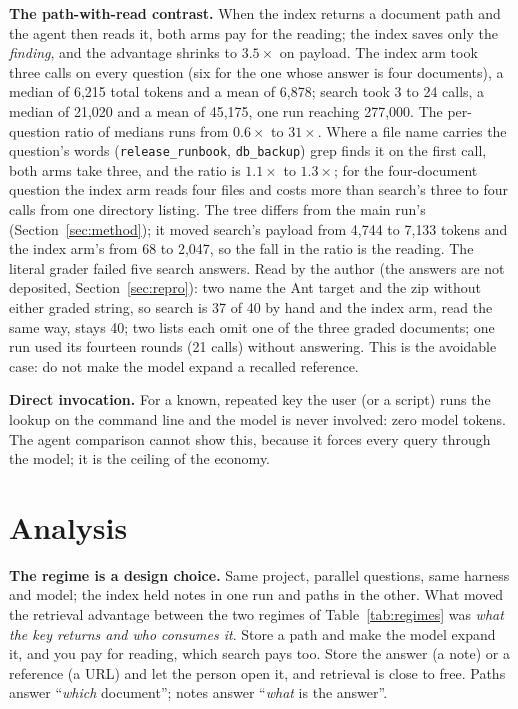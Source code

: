 \documentclass[11pt]{article}
\newcommand{\code}[1]{\texttt{#1}}
\begin{document}
\textbf{The path-with-read contrast.} When the index returns a document path and
the agent then reads it, both arms pay for the reading; the index saves only the
\emph{finding}, and the advantage shrinks to $3.5\times$ on payload. The index
arm took three calls on every question (six for the one whose answer is four
documents), a median of 6{,}215 total tokens and a mean of 6{,}878; search took
3 to 24 calls, a median of 21{,}020 and a mean of 45{,}175, one run reaching
277{,}000. The per-question ratio of medians runs from $0.6\times$ to $31\times$.
Where a file name carries the question's words (\code{release\_runbook},
\code{db\_backup}) grep finds it on the first call, both arms take three, and the
ratio is $1.1\times$ to $1.3\times$; for the four-document question the index
arm reads four files and costs more than search's three to four calls from one
directory listing. The tree differs from the main run's (Section~\ref{sec:method});
it moved search's payload from 4{,}744 to 7{,}133 tokens and the index arm's from
68 to 2{,}047, so the fall in the ratio is the reading. The literal grader failed
five search answers. Read by the author (the answers are not deposited,
Section~\ref{sec:repro}): two name the Ant target and the zip without either
graded string, so search is 37 of 40 by hand and the index arm, read the same
way, stays 40; two lists each omit one of the three graded documents; one run
used its fourteen rounds (21 calls) without answering. This is the avoidable
case: do not make the model expand a recalled reference.

\textbf{Direct invocation.} For a known, repeated key the user (or a script) runs
the lookup on the command line and the model is never involved: zero model tokens.
The agent comparison cannot show this, because it forces every query through the
model; it is the ceiling of the economy.

\section{Analysis}

\textbf{The regime is a design choice.} Same project, parallel questions, same
harness and model; the index held notes in one run and paths in the other. What
moved the retrieval advantage between the two regimes of Table~\ref{tab:regimes} was
\emph{what the key returns and who consumes it}. Store a path and make the model
expand it, and you pay for reading, which search pays too. Store the answer (a
note) or a reference (a URL) and let the person open it, and retrieval is
close to free. Paths answer ``\emph{which} document''; notes answer
``\emph{what} is the answer''.
\end{document}
